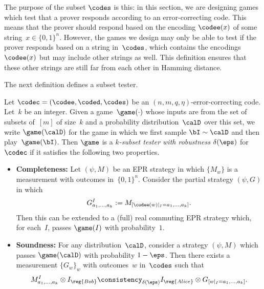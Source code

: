 \begin{remark}
The purpose of the subset $\codes$ is this:
in this section, we are designing games which test that a prover responds according to an error-correcting code.
This means that the prover should respond based on the encoding $\codee(x)$ of some string~$x \in \{0, 1\}^n$.
However, the games we design may only be able to test if the prover responds based on a string in~$\codes$,
which contains the encodings $\codee(x)$ but may include other strings as well.
This definition ensures that these other strings are still far from each other in Hamming distance.
\end{remark}

The next definition defines a subset tester.

\begin{definition}\label{def:testing-a-code}
Let $\codec = (\codee, \coded, \codes)$ be an $(n, m, q, \eta)$-error-correcting code.
Let~$k$ be an integer.
Given a game~$\game(\cdot)$  whose inputs are from the set of subsets of~$[m]$ of size~$k$
and a probability distribution~$\calD$ over this set,
we write $\game(\calD)$ for the game in which we first sample $\bI \sim \calD$ and then play~$\game(\bI)$.
Then $\game$ is a \emph{$k$-subset tester with robustness $\delta(\eps)$} for $\codec$ if it satisfies the following two properties.
\begin{itemize}
\item[$\circ$] \textbf{Completeness:}
Let $(\psi, M)$ be an EPR strategy in which $\{M_w\}$ is a measurement with outcomes in~$\{0, 1\}^n$.
Consider the partial strategy $(\psi, G)$ in which
\begin{equation*}
	G^I_{a_1, \ldots, a_k} := M_{[\codee(w)|_I = a_1, \ldots, a_k]}.
\end{equation*}
Then this can be extended to a (full) real commuting EPR strategy which, for each~$I$, passes $\game(I)$ with probability~$1$.
\item[$\circ$] \textbf{Soundness:} For any distribution~$\calD$, consider a strategy $(\psi, M)$ which passes $\game(\calD)$ with probability $1-\eps$.
Then there exists a measurement $\{G_w\}_{w}$ with outcomes~$w$ in~$\codes$ such that
\begin{equation*}
	M^I_{a_1, \ldots, a_k} \otimes I_{\reg{Bob}} \consistency_{\delta(\eps)} I_{\reg{Alice}} \otimes G_{[w|_I = a_1, \ldots, a_k]}.
\end{equation*}
\end{itemize}
\end{definition}

